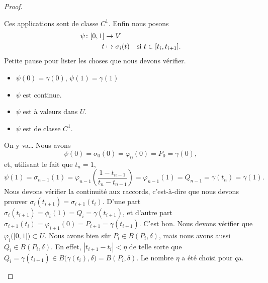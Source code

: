 \begin{proof}
\begin{subproof}
\begin{equation}
		\end{equation}
		Ces applications sont de classe \( C^1\). Enfin nous posons
		\begin{equation}        \label{EQooIQHHooGspmQJ}
			\begin{aligned}
				\psi\colon \mathopen[ 0 , 1 \mathclose] & \to V                                                                          \\
				t                                       & \mapsto \sigma_i(t) & \text{si \( t\in\mathopen[ t_i , t_{i+1} \mathclose]\)}.
			\end{aligned}
		\end{equation}
		Petite pause pour lister les choses que nous devons vérifier.
		\begin{itemize}
			\item \( \psi(0)=\gamma(0)\), \( \psi(1)=\gamma(1)\)
			\item \( \psi\) est continue.
			\item \( \psi\) est à valeurs dans \( U\).
			\item \( \psi\) est de classe \( C^1\).
		\end{itemize}
		On y va\ldots
		Nous avons
		\begin{equation}
			\psi(0)=\sigma_0(0)=\varphi_0(0)=P_0=\gamma(0),
		\end{equation}
		et, utilisant le fait que \( t_n=1\),
		\begin{equation}
			\psi(1)=\sigma_{n-1}(1)=\varphi_{n-1}\left( \frac{ 1-t_{n-1} }{ t_n-t_{n-1} } \right)=\varphi_{n-1}(1)=Q_{n-1}=\gamma(t_n)=\gamma(1).
		\end{equation}
		Nous devons vérifier la continuité aux raccords, c'est-à-dire que nous devons prouver \( \sigma_i(t_{i+1})=\sigma_{i+1}(t_i)\). D'une part \( \sigma_i(t_{i+1})=\phi_i(1)=Q_i=\gamma(t_{i+1})\), et d'autre part \( \sigma_{i+1}(t_i)=\varphi_{i+1}(0)=P_{i+1}=\gamma(t_{i+1})\). C'est bon.
		Nous devons vérifier que \( \varphi_i\big( \mathopen[ 0 , 1 \mathclose] \big)\subset U\). Nous avons bien sûr \( P_i\in B(P_i,\delta)\), mais nous avons aussi \( Q_i\in B(P_i,\delta)\). En effet, \( | t_{i+1}-t_i |<\eta\) de telle sorte que \( Q_i=\gamma(t_{i+1})\in B\big( \gamma(t_i),\delta \big)=B(P_i,\delta)\). Le nombre \( \eta\) a été choisi pour ça.


\end{subproof}
\end{proof}
